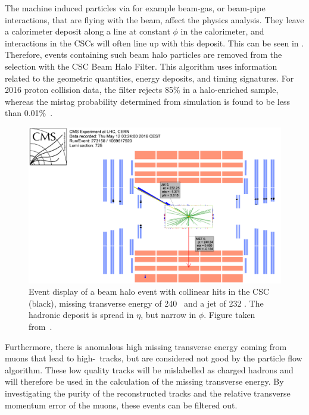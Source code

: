 The machine induced particles via for example beam-gas, or beam-pipe interactions, that are flying with the beam, affect the physics analysis. They leave a calorimeter deposit along a line at constant $\phi$ in the calorimeter, and interactions in the CSCs will often line up with this deposit. This can be seen in . Therefore, events containing such beam halo particles are removed from the selection with the CSC Beam Halo Filter. This algorithm uses information related to the geometric quantities, energy deposits, and timing signatures. For 2016 proton collision data, the filter rejects 85\% in a halo-enriched sample, whereas the mistag probability determined from simulation is found to  be less than 0.01\%~\cite{CMS-PAS-JME-16-004}.  
\begin{figure}[htbp]
	\centering
	\includegraphics[width=.7\linewidth]{5_EventSelection/Figures/Figure_004}
	\caption{Event display of a beam halo event with collinear hits in the CSC (black), missing transverse energy of 240 \GeV\, and a jet of 232 \GeV. The hadronic deposit is spread in $\eta$, but narrow in $\phi$. Figure taken from~\cite{CMS-PAS-JME-16-004}. }
	\label{fig:beamhalo}
\end{figure}

Furthermore, there is anomalous high missing transverse energy coming from muons that lead to high-\pt\ tracks, but are considered not good by the particle flow algorithm. These low quality tracks will be  mislabelled as charged hadrons and will therefore be used in the calculation of the missing transverse energy. By investigating the purity of the reconstructed tracks and the relative transverse momentum error of the muons, these events can be filtered out. 





